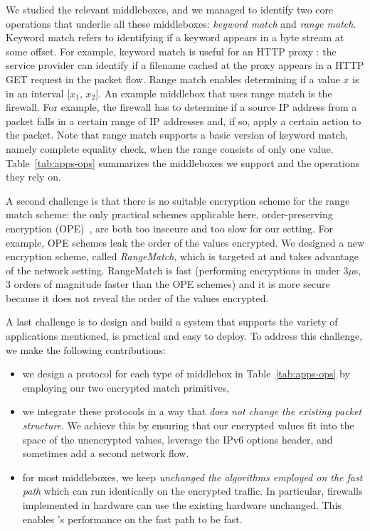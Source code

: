 We studied the relevant middleboxes, and we managed to identify two core operations that underlie all these middleboxes: {\em keyword match} and {\em range match}. Keyword match refers to  identifying if a keyword appears in a byte stream at some offset.   For example, keyword match is useful for an HTTP proxy : the service provider can identify if a filename cached at the proxy appears in a HTTP GET request in the packet flow. %
Range match enables determining if a value $x$ is in an interval [$x_1$, $x_2$]. An example middlebox that uses range match is the firewall.   For example, the firewall has to determine if a source IP address from a packet falls in a certain range of IP addresses and, if so, apply a certain action to the packet.  Note that range match supports a basic version of keyword match, namely complete equality check, when the range consists of only one value.
%
Table~\ref{tab:apps-ops} summarizes the middleboxes we support and the operations they rely on. 


A second challenge is that there is no suitable encryption scheme for the range match scheme:
 the only practical schemes applicable here, order-preserving encryption (OPE)~\cite{boldyreva:ope,popa:mope}, are both too insecure and too slow for our setting.  For example, OPE schemes leak the order of the values encrypted. We designed a new encryption scheme, called {\em RangeMatch}, which is targeted at and takes advantage of the network setting. RangeMatch  is fast (performing encryptions in under 3$\mu$s, 3 orders of magnitude faster than the OPE schemes) and it is more secure because it does not reveal the order of the values encrypted. 
 
A last challenge is to design and build a system that supports the variety of applications mentioned, is practical and easy to deploy. 
To address this challenge, we make the following contributions:
\begin{itemize}
\item we design a  protocol for each type of middlebox in Table~\ref{tab:apps-ops} by employing our two encrypted match  primitives,
\item  we integrate these protocols in a way that {\em does not change the existing packet structure}. We achieve this by ensuring that our encrypted values fit into the space of the unencrypted values, leverage the IPv6 options header, and sometimes add a second network flow.
\item  for most middleboxes, we keep {\em unchanged  the algorithms employed on the fast path} which can run identically on the encrypted traffic. In particular, firewalls implemented in hardware can use the existing hardware unchanged.  This enables \sys's performance on the fast path to be fast. 
\end{itemize}




